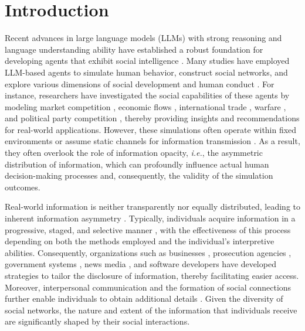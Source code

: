 
\section{Introduction}
Recent advances in large language models (LLMs) with strong reasoning and language understanding ability have established a robust foundation for developing agents that exhibit social intelligence \cite{b1}. Many studies have employed LLM-based agents to simulate human behavior, construct social networks, and explore various dimensions of social development and human conduct \cite{m56,b3}. For instance, researchers have investigated the social capabilities of these agents by modeling market competition \cite{m37}, economic flows \cite{m59}, international trade \cite{b2}, warfare \cite{m60}, and political party competition \cite{m63}, thereby providing insights and recommendations for real-world applications. However, these simulations often operate within fixed environments \cite{m9} or assume static channels for information transmission \cite{b55}. As a result, they often overlook the role of information opacity, \emph{i.e.}, the asymmetric distribution of information, which can profoundly influence actual human decision-making processes and, consequently, the validity of the simulation outcomes.

Real-world information is neither transparently nor equally distributed, leading to inherent information asymmetry \cite{b13}. Typically, individuals acquire information in a progressive, staged, and selective manner \cite{b37,b38}, with the effectiveness of this process depending on both the methods employed and the individual’s interpretive abilities. Consequently, organizations such as businesses \cite{b5}, prosecution agencies \cite{b10}, government systems \cite{b6,b8}, news media \cite{b9}, and software developers \cite{b7} have developed strategies to tailor the disclosure of information, thereby facilitating easier access. Moreover, interpersonal communication and the formation of social connections further enable individuals to obtain additional details \cite{b14}. Given the diversity of social networks, the nature and extent of the information that individuals receive are significantly shaped by their social interactions.

